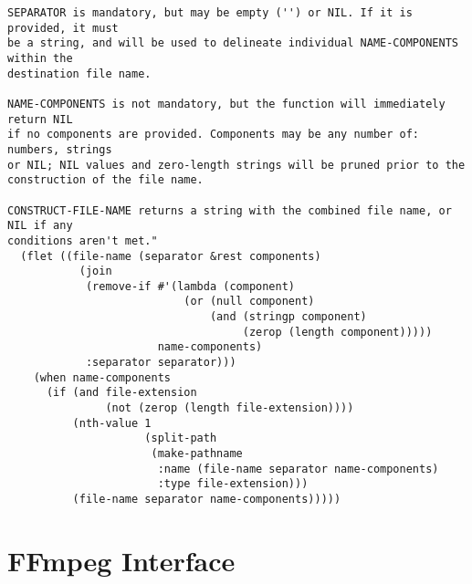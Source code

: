 \documentclass{article}
\begin{document}
\begin{verbatim}
SEPARATOR is mandatory, but may be empty ('') or NIL. If it is provided, it must
be a string, and will be used to delineate individual NAME-COMPONENTS within the
destination file name.

NAME-COMPONENTS is not mandatory, but the function will immediately return NIL
if no components are provided. Components may be any number of: numbers, strings
or NIL; NIL values and zero-length strings will be pruned prior to the
construction of the file name.

CONSTRUCT-FILE-NAME returns a string with the combined file name, or NIL if any
conditions aren't met."
  (flet ((file-name (separator &rest components)
           (join
            (remove-if #'(lambda (component)
                           (or (null component)
                               (and (stringp component)
                                    (zerop (length component)))))
                       name-components)
            :separator separator)))
    (when name-components
      (if (and file-extension
               (not (zerop (length file-extension))))
          (nth-value 1
                     (split-path
                      (make-pathname
                       :name (file-name separator name-components)
                       :type file-extension)))
          (file-name separator name-components)))))
\end{verbatim}

\section{FFmpeg Interface}
\label{sec:orgc7dc460}
\end{document}
